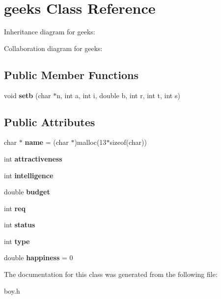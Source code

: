 \hypertarget{classgeeks}{}\section{geeks Class Reference}
\label{classgeeks}


Inheritance diagram for geeks\+:


Collaboration diagram for geeks\+:
\subsection*{Public Member Functions}
\begin{DoxyCompactItemize}
\item 
void {\bfseries setb} (char $\ast$n, int a, int i, double b, int r, int t, int s)\hypertarget{classgeeks_ac3d560fa0dbb9b6b659e418dd527d205}{}\label{classgeeks_ac3d560fa0dbb9b6b659e418dd527d205}

\end{DoxyCompactItemize}
\subsection*{Public Attributes}
\begin{DoxyCompactItemize}
\item 
char $\ast$ {\bfseries name} = (char $\ast$)malloc(13$\ast$sizeof(char))\hypertarget{classgeeks_a94321d2544b3a421e97cb5ebf3b837d9}{}\label{classgeeks_a94321d2544b3a421e97cb5ebf3b837d9}

\item 
int {\bfseries attractiveness}\hypertarget{classgeeks_abd24a6e3d578de03ca4dca24d8040098}{}\label{classgeeks_abd24a6e3d578de03ca4dca24d8040098}

\item 
int {\bfseries intelligence}\hypertarget{classgeeks_adbd8b48df9a9fa4afb4e43787bbac540}{}\label{classgeeks_adbd8b48df9a9fa4afb4e43787bbac540}

\item 
double {\bfseries budget}\hypertarget{classgeeks_aea4a485f7374ac7163ba4dc8b0c8401a}{}\label{classgeeks_aea4a485f7374ac7163ba4dc8b0c8401a}

\item 
int {\bfseries req}\hypertarget{classgeeks_adf9aa4b0d58cc1bdd40d34e6575d383c}{}\label{classgeeks_adf9aa4b0d58cc1bdd40d34e6575d383c}

\item 
int {\bfseries status}\hypertarget{classgeeks_a2bfb9cfe998060ebfd9456193d52a834}{}\label{classgeeks_a2bfb9cfe998060ebfd9456193d52a834}

\item 
int {\bfseries type}\hypertarget{classgeeks_a4f439f3deb4a5786bd588547a974f5ae}{}\label{classgeeks_a4f439f3deb4a5786bd588547a974f5ae}

\item 
double {\bfseries happiness} = 0\hypertarget{classgeeks_ab554b3da3adfad08fd7382a4fb93f8d5}{}\label{classgeeks_ab554b3da3adfad08fd7382a4fb93f8d5}

\end{DoxyCompactItemize}


The documentation for this class was generated from the following file\+:\begin{DoxyCompactItemize}
\item 
boy.\+h\end{DoxyCompactItemize}
